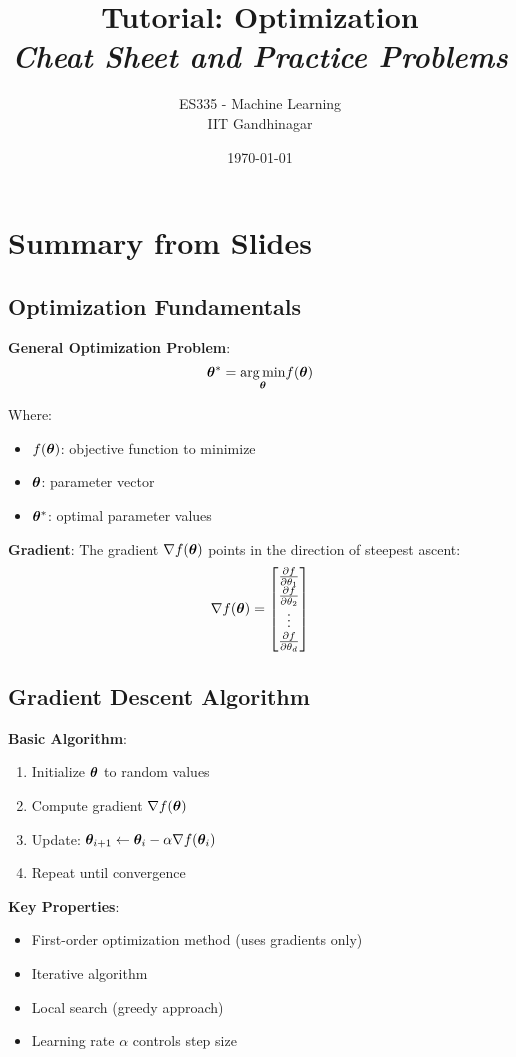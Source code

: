 \documentclass{article}
\title{\textbf{Tutorial: Optimization} \\ \textit{Cheat Sheet and Practice Problems}}
\author{ES335 - Machine Learning \\ IIT Gandhinagar}
\date{\today}
\begin{document}
\maketitle

\section{Summary from Slides}

\subsection{Optimization Fundamentals}

\textbf{General Optimization Problem}:
$$\boldsymbol{\theta}^* = \underset{\boldsymbol{\theta}}{\operatorname*{arg\,min}} f(\boldsymbol{\theta})$$

Where:
\begin{itemize}
    \item $f(\boldsymbol{\theta})$: objective function to minimize
    \item $\boldsymbol{\theta}$: parameter vector
    \item $\boldsymbol{\theta}^*$: optimal parameter values
\end{itemize}

\textbf{Gradient}: The gradient $\nabla f(\boldsymbol{\theta})$ points in the direction of steepest ascent:
$$\nabla f(\boldsymbol{\theta}) = \begin{bmatrix}
\frac{\partial f}{\partial \theta_1} \\
\frac{\partial f}{\partial \theta_2} \\
\vdots \\
\frac{\partial f}{\partial \theta_d}
\end{bmatrix}$$

\subsection{Gradient Descent Algorithm}

\textbf{Basic Algorithm}:
\begin{enumerate}
    \item Initialize $\boldsymbol{\theta}$ to random values
    \item Compute gradient $\nabla f(\boldsymbol{\theta})$
    \item Update: $\boldsymbol{\theta}_{i+1} \leftarrow \boldsymbol{\theta}_i - \alpha \nabla f(\boldsymbol{\theta}_i)$
    \item Repeat until convergence
\end{enumerate}

\textbf{Key Properties}:
\begin{itemize}
    \item First-order optimization method (uses gradients only)
    \item Iterative algorithm
    \item Local search (greedy approach)
    \item Learning rate $\alpha$ controls step size
\end{itemize}
\end{document}
